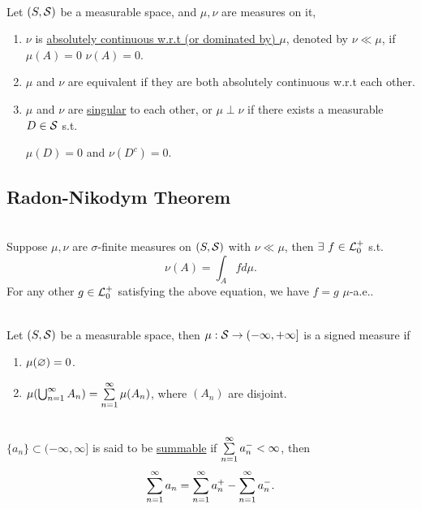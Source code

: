 \vspace{3pt}
\begin{definition}\  \\
Let $(S, \mathcal{S})$ be a measurable space, and $\mu,\nu$ are measures on it,
\begin{enumerate}[label = (\arabic*)]
    \item $\nu$ is \underline{absolutely continuous w.r.t  (or dominated by) $\mu$}, denoted by $\nu \ll \mu$, if $\mu(A) = 0$ \imply $\nu(A) = 0$.
    \item $\mu$ and $\nu$ are equivalent if they are both absolutely continuous w.r.t each other.
    \item $\mu$ and $\nu$ are \underline{singular} to each other, or $\mu \perp \nu$ if there exists a measurable $D \in \mathcal{S}$ s.t. 
    \begin{center}
        $\mu(D) = 0$ and $\nu(D^c) = 0$.
    \end{center}
\end{enumerate}
\end{definition}


\subsection{Radon-Nikodym Theorem}
\begin{theorem}\label{R-N thm}\ \\
Suppose $\mu,\nu$ are $\sigma$-finite measures on $(S,\mathcal{S})$ with $\nu \ll \mu$, then $\exists\ f \in \mathcal{L}_0^+$ s.t.
\begin{equation*}
    \nu(A) = \int_A f d\mu.
\end{equation*}
For any other $g \in \mathcal{L}_0^+$ satisfying the above equation, we have $f = g$ $\mu$-a.e..
\end{theorem}

\begin{definition}\ \\
Let $(S,\mathcal{S})$ be a measurable space, then $\mu: \mathcal{S} \to (-\infty,+\infty]$ is a signed measure if
\begin{enumerate}[label = (\alph*)]
    \item $\mu(\varnothing) = 0$.
    \item $\mu(\bigcup_{n=1}^{\infty} A_n) = \sum\limits_{n=1}^\infty \mu(A_n)$, where $(A_n)$ are disjoint.
\end{enumerate}
\end{definition}

\begin{definition}\ \\
$\{a_n\} \subset (-\infty,\infty]$ is said to be \underline{summable} if $\sum\limits_{n=1}^\infty a_n^- < \infty$, then 
\begin{equation*}
    \sum\limits_{n=1}^\infty a_n = \sum\limits_{n=1}^\infty a_n^+ - \sum\limits_{n=1}^\infty a_n^-.
\end{equation*}
\end{definition}

